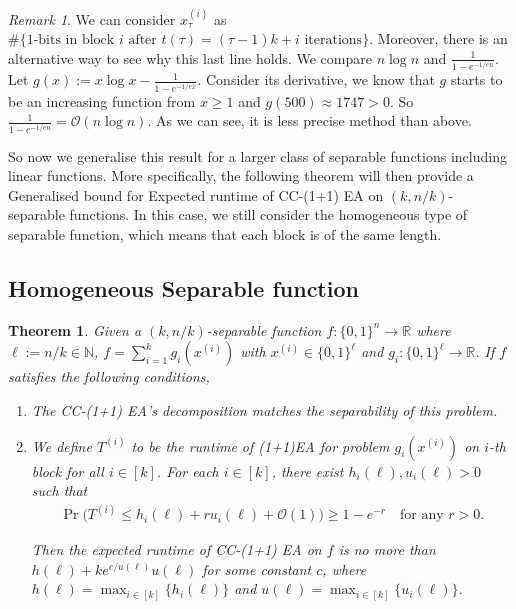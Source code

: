 \documentclass[a4paper,11pt]{report}
\theoremstyle{plain} %
\newtheorem{thm}{Theorem}[section]
\theoremstyle{definition} %
\theoremstyle{remark} %
\newtheorem*{rem}{Remark}
\begin{document}
\begin{rem} We can consider $x_{\tau}^{(i)}$ as $\# \{\text{1-bits in block $i$ after $t(\tau)=(\tau -1)k+i$ iterations}\}$. 
Moreover, there is an alternative way to see why this last line holds. We compare $n \log n$ and $\frac{1}{1-e^{-1/en}}$. Let $g(x):=x \log x - \frac{1}{1-e^{-1/ex}}$. Consider its derivative, we know that $g$ starts to be an increasing function from $x\geq 1$ and $g(500)\approx 1747 >0$. So $\frac{1}{1-e^{-1/en}} = \mathcal{O}(n\log n)$. As we can see, it is less precise method than above.
\end{rem}

\par So now we generalise this result for a larger class of separable functions including linear functions. More specifically, the following theorem will then provide a Generalised bound for Expected runtime of CC-(1+1) EA on $(k, n/k)$- separable functions. In this case, we still consider the homogeneous type of separable function, which means that each block is of the same length.


\subsection{Homogeneous Separable function}
\begin{thm}Given a $(k,n/k)$-separable function $f:\{0,1\}^n \rightarrow \mathbb{R}$ where $\ell:=n/k \in \mathbb{N}$, $f=\sum_{i=1}^k g_{i}(x^{(i)})$ with $x^{(i)}\in \{0,1\}^{\ell}$ and $g_{i}:\{0,1\}^{\ell} \rightarrow \mathbb{R}$. If $f$ satisfies the following conditions,


\begin{enumerate}
    \item[(1)] The CC-(1+1) EA's decomposition matches the separability of this problem. 
    
    \item[(2)] We define  $T^{(i)}$ to be the runtime of (1+1)EA for problem $g_{i}(x^{(i)})$ on $i$-th block for all $i \in [k]$.  For each $i \in [k]$, there exist $h_{i}(\ell), u_{i}(\ell)>0$ such that 
    \begin{align*}
        \Pr \big( T^{(i)}\leq h_{i}(\ell) +r u_{i}(\ell) +\mathcal{O}(1) \big) \geq 1-e^{-r} \quad \text{for any $r>0$}.
    \end{align*}

Then the expected runtime of CC-(1+1) EA on $f$ is no more than $h(\ell)+ke^{c/u(\ell)}u(\ell)$ for some constant $c$, where $h(\ell)=\max _{i\in [k]} \{h_{i}(\ell)\}$ and $u(\ell)=\max _{i\in [k]} \{u_{i}(\ell)\}$.

\end{enumerate}

\end{thm}
\end{document}
